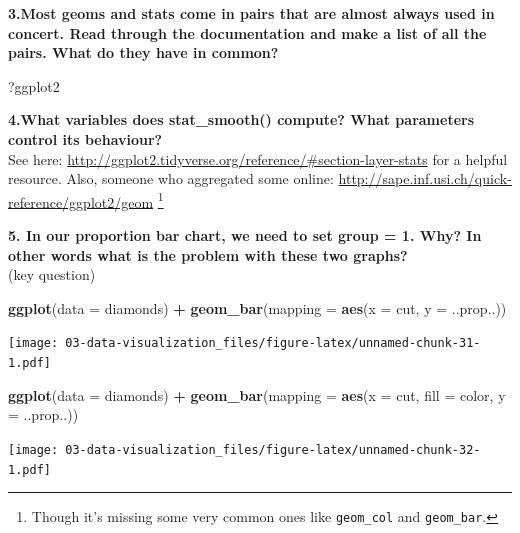 \documentclass[]{book}
\newenvironment{Shaded}{\begin{snugshade}}{\end{snugshade}}
\newcommand{\DataTypeTok}[1]{\textcolor[rgb]{0.13,0.29,0.53}{#1}}
\newcommand{\KeywordTok}[1]{\textcolor[rgb]{0.13,0.29,0.53}{\textbf{#1}}}
\newcommand{\NormalTok}[1]{#1}
\newcommand{\OperatorTok}[1]{\textcolor[rgb]{0.81,0.36,0.00}{\textbf{#1}}}
\newcommand{\StringTok}[1]{\textcolor[rgb]{0.31,0.60,0.02}{#1}}
\let\rmarkdownfootnote\footnote%
\def\footnote{\protect\rmarkdownfootnote}
\theoremstyle{definition}
\theoremstyle{definition}
\theoremstyle{definition}
\theoremstyle{remark}
\begin{document}
\textbf{3.Most geoms and stats come in pairs that are almost always used
in concert. Read through the documentation and make a list of all the
pairs. What do they have in common?}

\begin{Shaded}
\begin{Highlighting}[]
\NormalTok{?ggplot2}
\end{Highlighting}
\end{Shaded}

\textbf{4.What variables does stat\_smooth() compute? What parameters
control its behaviour?}\\
See here:
\url{http://ggplot2.tidyverse.org/reference/\#section-layer-stats} for a
helpful resource. Also, someone who aggregated some online:
\url{http://sape.inf.usi.ch/quick-reference/ggplot2/geom} \footnote{Though
  it's missing some very common ones like \texttt{geom\_col} and
  \texttt{geom\_bar}.}

\textbf{5. In our proportion bar chart, we need to set group = 1. Why?
In other words what is the problem with these two graphs?}\\
(key question)

\begin{Shaded}
\begin{Highlighting}[]
\KeywordTok{ggplot}\NormalTok{(}\DataTypeTok{data =}\NormalTok{ diamonds) }\OperatorTok{+}\StringTok{ }
\StringTok{  }\KeywordTok{geom_bar}\NormalTok{(}\DataTypeTok{mapping =} \KeywordTok{aes}\NormalTok{(}\DataTypeTok{x =}\NormalTok{ cut, }\DataTypeTok{y =}\NormalTok{ ..prop..))}
\end{Highlighting}
\end{Shaded}

\texttt{[image: 03-data-visualization\_files/figure-latex/unnamed-chunk-31-1.pdf]}

\begin{Shaded}
\begin{Highlighting}[]
\KeywordTok{ggplot}\NormalTok{(}\DataTypeTok{data =}\NormalTok{ diamonds) }\OperatorTok{+}\StringTok{ }
\StringTok{  }\KeywordTok{geom_bar}\NormalTok{(}\DataTypeTok{mapping =} \KeywordTok{aes}\NormalTok{(}\DataTypeTok{x =}\NormalTok{ cut, }\DataTypeTok{fill =}\NormalTok{ color, }\DataTypeTok{y =}\NormalTok{ ..prop..))}
\end{Highlighting}
\end{Shaded}

\texttt{[image: 03-data-visualization\_files/figure-latex/unnamed-chunk-32-1.pdf]}
\end{document}
